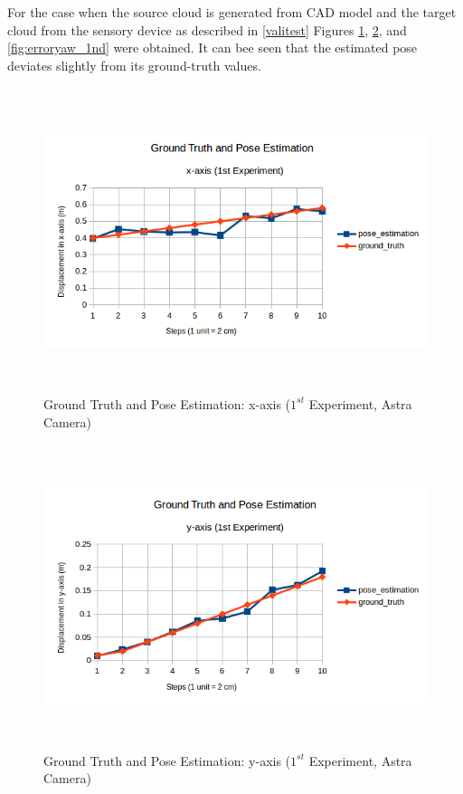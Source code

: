 For the case when the source cloud is generated from CAD model and the target cloud from the sensory device as described in \ref{valitest} Figures \ref{fig:errorx_1nd}, \ref{fig:errory_1nd}, and \ref{fig:erroryaw_1nd} were obtained. It can bee seen that the estimated pose deviates slightly from its ground-truth values.
\begin{figure}[!h]
\begin{center}
\includegraphics[width=5in, height=3.5in]{figures05/1_x_validation.png}
\caption{Ground Truth and Pose Estimation: x-axis ($1^{st}$ Experiment, Astra Camera)}
\label{fig:errorx_1nd}
\end{center}
\end{figure}
\begin{figure}[!h]
\begin{center}
\includegraphics[width=5in, height=3.5in]{figures05/1_y_validation.png}
\caption{Ground Truth and Pose Estimation: y-axis ($1^{st}$ Experiment, Astra Camera)}
\label{fig:errory_1nd}
\end{center}
\end{figure}
